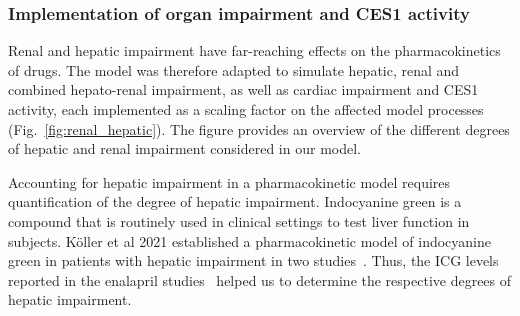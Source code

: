 \documentclass[pharmaceutics,article,submit,pdftex,moreauthors]{Definitions/mdpi}
\begin{document}
\subsubsection{Implementation of organ impairment and CES1 activity}

Renal and hepatic impairment have far-reaching effects on the pharmacokinetics of drugs. The model was therefore adapted to simulate hepatic, renal and combined hepato-renal impairment, as well as cardiac impairment and CES1 activity, each implemented as a scaling factor on the affected model processes (Fig.~\ref{fig:renal_hepatic}). The figure provides an overview of the different degrees of hepatic and renal impairment considered in our model. 

Accounting for hepatic impairment in a pharmacokinetic model requires quantification of the degree of hepatic impairment. Indocyanine green is a compound that is routinely used in clinical settings to test liver function in subjects. Köller et al 2021 established a pharmacokinetic model of indocyanine green in patients with hepatic impairment in two studies~\cite{Koller2021, Koller2021a}. Thus, the ICG levels reported in the enalapril studies~\cite{Baba1989, Ohnishi1989} helped us to determine the respective degrees of hepatic impairment.
\end{document}
